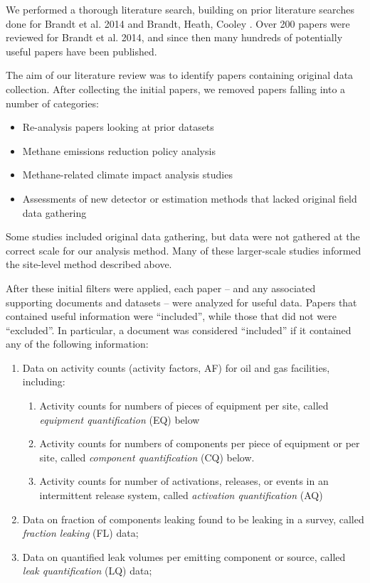 \documentclass[11pt]{report}
\begin{document}
We performed a thorough literature search, building on prior literature searches done for Brandt et al. 2014 \cite{Brandt2014} and Brandt, Heath, Cooley \cite{Brandt2016}. Over 200 papers were reviewed for Brandt et al. 2014, and since then many hundreds of potentially useful papers have been published.

The aim of our literature review was to identify papers containing original data collection. After collecting the initial papers, we removed papers falling into a number of categories:
\begin{itemize}
\item Re-analysis papers looking at prior datasets
\item Methane emissions reduction policy analysis
\item Methane-related climate impact analysis studies
\item Assessments of new detector or estimation methods that lacked original field data gathering
\end{itemize}
Some studies included original data gathering, but data were not gathered at the correct scale for our analysis method.  Many of these larger-scale studies informed the site-level method described above. 

After these initial filters were applied, each paper -- and any associated supporting documents and datasets -- were analyzed for useful data.  Papers that contained useful information were ``included'', while those that did not were ``excluded''. In particular, a document was considered ``included'' if it contained any of the following information:

\begin{enumerate}
\item Data on activity counts (activity factors, AF) for oil and gas facilities, including:
	\begin{enumerate}
	\item Activity counts for numbers of pieces of equipment per site, called \textit{equipment quantification} (EQ) below
	\item Activity counts for numbers of components per piece of equipment or per site, called \textit{component quantification} (CQ) below.
	\item Activity counts for number of activations, releases, or events in an intermittent release system, called \textit{activation quantification} (AQ)
	\end{enumerate}
\item Data on fraction of components leaking found to be leaking in a survey, called \textit{fraction leaking} (FL) data;
\item Data on quantified leak volumes per emitting component or source, called \textit{leak quantification} (LQ) data;
\end{enumerate}
\end{document}
